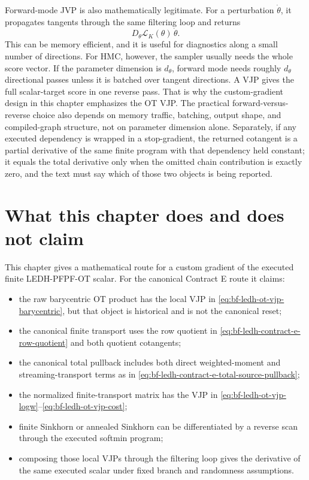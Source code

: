 Forward-mode JVP is also mathematically legitimate.  For a perturbation
\(\dot\theta\), it propagates tangents through the same filtering loop and
returns
\[
  D_\theta\mathcal L_K(\theta)\,\dot\theta .
\]
This can be memory efficient, and it is useful for diagnostics along a small
number of directions.  For HMC, however, the sampler usually needs the whole
score vector.  If the parameter dimension is \(d_\theta\), forward mode needs
roughly \(d_\theta\) directional passes unless it is batched over tangent
directions.  A VJP gives the full scalar-target score in one reverse pass.  That
is why the custom-gradient design in this chapter emphasizes the OT VJP.  The
practical forward-versus-reverse choice also depends on memory traffic,
batching, output shape, and compiled-graph structure, not on parameter
dimension alone.  Separately, if any executed dependency is wrapped in a
stop-gradient, the returned cotangent is a partial derivative of the same
finite program with that dependency held constant; it equals the total
derivative only when the omitted chain contribution is exactly zero, and the
text must say which of those two objects is being reported.

\section{What this chapter does and does not claim}
\label{sec:bf-ledh-ot-boundary}

This chapter gives a mathematical route for a custom gradient of the executed
finite LEDH-PFPF-OT scalar.  For the canonical Contract E route it claims:
\begin{itemize}
  \item the raw barycentric OT product has the local VJP in
  \eqref{eq:bf-ledh-ot-vjp-barycentric}, but that object is historical and is
  not the canonical reset;
  \item the canonical finite transport uses the row quotient in
  \eqref{eq:bf-ledh-contract-e-row-quotient} and both quotient cotangents;
  \item the canonical total pullback includes both direct weighted-moment and
  streaming-transport terms as in
  \eqref{eq:bf-ledh-contract-e-total-source-pullback};
  \item the normalized finite-transport matrix has the VJP in
  \eqref{eq:bf-ledh-ot-vjp-logw}--\eqref{eq:bf-ledh-ot-vjp-cost};
  \item finite Sinkhorn or annealed Sinkhorn can be differentiated by a reverse
  scan through the executed softmin program;
  \item composing those local VJPs through the filtering loop gives the
  derivative of the same executed scalar under fixed branch and randomness
  assumptions.
\end{itemize}

